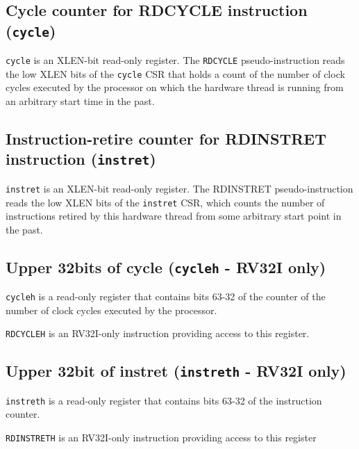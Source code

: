 \subsection{Cycle counter for RDCYCLE instruction
(\texttt{cycle})}\label{cycle-counter-for-rdcycle-instruction-cycle}

\texttt{cycle} is an XLEN-bit read-only register. The \texttt{RDCYCLE} pseudo-instruction
reads the low XLEN bits of the \texttt{cycle} CSR that holds a count of the
number of clock cycles executed by the processor on which the hardware
thread is running from an arbitrary start time in the past.

\subsection{Instruction-retire counter for RDINSTRET instruction
(\texttt{instret})}\label{instruction-retire-counter-for-rdinstret-instruction-instret}

\texttt{instret} is an XLEN-bit read-only register. The RDINSTRET
pseudo-instruction reads the low XLEN bits of the \texttt{instret} CSR, which
counts the number of instructions retired by this hardware thread from
some arbitrary start point in the past.

\subsection{Upper 32bits of cycle (\texttt{cycleh} - RV32I
only)}\label{upper-32bits-of-cycle-cycleh---rv32i-only}

\texttt{cycleh} is a read-only register that contains bits 63-32 of the counter
of the number of clock cycles executed by the processor.

\texttt{RDCYCLEH} is an RV32I-only instruction providing access to this register.

\subsection{Upper 32bit of instret (\texttt{instreth} - RV32I
only)}\label{upper-32bit-of-instret-instreth---rv32i-only}

\texttt{instreth} is a read-only register that contains bits 63-32 of the
instruction counter.

\texttt{RDINSTRETH} is an RV32I-only instruction providing access to this
register
